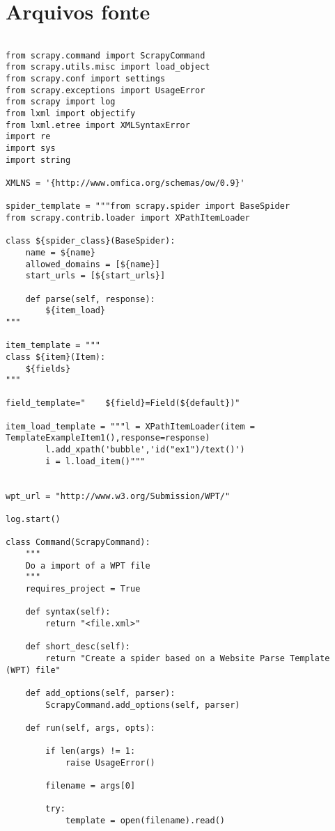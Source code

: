 \appendix
\chapter{Arquivos fonte}

\begin{lstlisting}

from scrapy.command import ScrapyCommand
from scrapy.utils.misc import load_object
from scrapy.conf import settings
from scrapy.exceptions import UsageError
from scrapy import log
from lxml import objectify
from lxml.etree import XMLSyntaxError
import re
import sys
import string

XMLNS = '{http://www.omfica.org/schemas/ow/0.9}' 

spider_template = """from scrapy.spider import BaseSpider
from scrapy.contrib.loader import XPathItemLoader

class ${spider_class}(BaseSpider):
    name = ${name}
    allowed_domains = [${name}]
    start_urls = [${start_urls}]

    def parse(self, response):
        ${item_load}
"""

item_template = """
class ${item}(Item):
    ${fields}
"""

field_template="    ${field}=Field(${default})"

item_load_template = """l = XPathItemLoader(item = TemplateExampleItem1(),response=response)
        l.add_xpath('bubble','id("ex1")/text()') 
        i = l.load_item()"""


wpt_url = "http://www.w3.org/Submission/WPT/"

log.start()

class Command(ScrapyCommand):
    """
    Do a import of a WPT file 
    """
    requires_project = True

    def syntax(self):
        return "<file.xml>"

    def short_desc(self):
        return "Create a spider based on a Website Parse Template (WPT) file"

    def add_options(self, parser):
        ScrapyCommand.add_options(self, parser)

    def run(self, args, opts):

        if len(args) != 1:
            raise UsageError()

        filename = args[0]

        try:
            template = open(filename).read()


\end{lstlisting}
